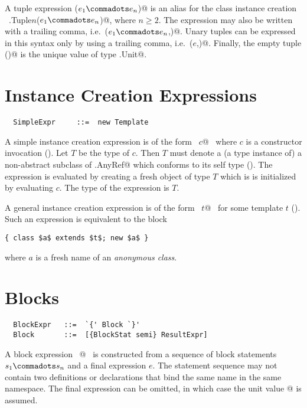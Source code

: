 A tuple expression \lstinline@($e_1 \commadots e_n$)@ is an alias
for the class instance creation 
~\lstinline@scala.Tuple$n$($e_1 \commadots e_n$)@, where $n \geq 2$.  
The expression may also be written
with a trailing comma, i.e.\ \lstinline@($e_1 \commadots e_n$,)@.
Unary tuples can be expressed in
this syntax only by using a trailing comma,
i.e.\ \lstinline@($e$,)@. Finally, the empty tuple
\lstinline@()@ is the unique value of type \lstinline@scala.Unit@.

\section{Instance Creation Expressions}
\label{sec:inst-creation}

\syntax\begin{lstlisting}
  SimpleExpr     ::=  new Template
\end{lstlisting}

A simple instance creation expression is of the form ~\lstinline@new $c$@~ 
where $c$ is a constructor invocation
().  Let $T$ be the type of $c$. Then $T$ must
denote a (a type instance of) a non-abstract subclass of
\lstinline@scala.AnyRef@ which conforms to its self type
(). The expression is evaluated by creating a fresh
object of type $T$ which is is initialized by evaluating $c$. The
type of the expression is $T$.

A general instance creation expression is of the form 
~\lstinline@new $t$@~ for some template $t$ ().
Such an expression is equivalent to the block
\begin{lstlisting}
{ class $a$ extends $t$; new $a$ }
\end{lstlisting}
where $a$ is a fresh name of an {\em anonymous class}.

\section{Blocks}
\label{sec:blocks}

\syntax\begin{lstlisting}
  BlockExpr   ::=  `{' Block `}'
  Block       ::=  [{BlockStat semi} ResultExpr]
\end{lstlisting}

A block expression ~@~ is
constructed from a sequence of block statements $s_1 \commadots s_n$
and a final expression $e$.  The statement sequence may not contain
two definitions or declarations that bind the same name in the same
namespace.  The final expression can be omitted, in which
case the unit value \lstinline@{}@ is assumed.


